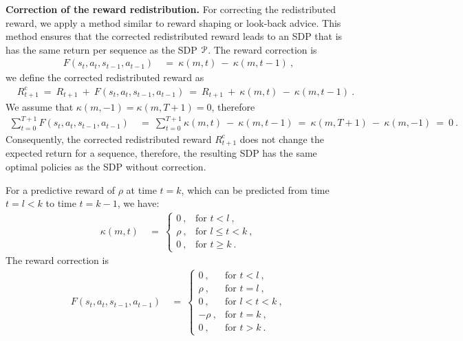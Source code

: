 \documentclass{article}
\newcommand{\Rc}{\mathrm{c}} \newcommand{\Rd}{\mathrm{d}}
\renewcommand{\leq}{\leqslant}
\renewcommand{\geq}{\geqslant}
\begin{document}
\begin{appendices}
{\bf Correction of the reward redistribution.}
For correcting the redistributed reward, we apply 
a method similar to reward shaping or look-back advice.
This method ensures that the corrected redistributed reward 
leads to an SDP that is has the same return per sequence as the
SDP $\mathcal{P}$.
The reward correction is 
\begin{align}
 F(s_t,a_t,s_{t-1},a_{t-1}) \ &= \ \kappa(m,t) \ - \ \kappa(m,t-1) \ ,
\end{align}
we define the corrected redistributed reward as
\begin{align}
  &R^{\Rc}_{t+1} \ = \ R_{t+1} \ + \ F(s_t,a_t,s_{t-1},a_{t-1}) \ = \ 
  R_{t+1} \ + \ \kappa(m,t) \ - \ \kappa(m,t-1) \ .
\end{align}
We assume that $\kappa(m,-1)=\kappa(m,T+1)=0$, therefore
\begin{align}
 \sum_{t=0}^{T+1} F(s_t,a_t,s_{t-1},a_{t-1})  \ &= \  
 \sum_{t=0}^{T+1} \kappa(m,t) \ - \ \kappa(m,t-1) \ = \ 
 \kappa(m,T+1) \ - \ \kappa(m,-1) \ = \  0 \ . 
\end{align} 
Consequently, the corrected redistributed reward $R^{\Rc}_{t+1}$ does not
change the expected return for a sequence, therefore, the resulting SDP has the
same optimal policies as the SDP without correction. 


For a predictive reward of $\rho$ at time $t=k$, which
can be predicted from time $t=l<k$ to time $t=k-1$, we have:
\begin{align}
  \kappa(m,t)  \ &= \
  \begin{cases}
    0 \ , & \text{for } t < l \ , \\
    \rho \ , & \text{for } l \leq t < k \ ,\\
    0 \ , & \text{for } t \geq k \ .
  \end{cases} 
\end{align}
The reward correction is
\begin{align}
  F(s_t,a_t,s_{t-1},a_{t-1}) \ &= \
  \begin{cases}
    0 \ , & \text{for } t < l \ , \\
    \rho \ , & \text{for } t = l  \ , \\
    0 \ , & \text{for } l < t < k \ , \\
    -\rho \ , & \text{for } t = k  \ , \\
    0 \ , & \text{for } t > k \ .
  \end{cases} 
\end{align}


\end{appendices}
\end{document}
